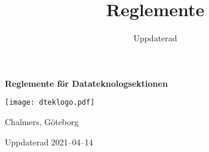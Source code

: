 \documentclass{dtek}
\title{Reglemente}
\date{Uppdaterad \updated}
\newcommand{\updated}{2021--04--14}
\begin{document}
\makeheadfoot%

\begin{center}
  {\Huge \textbf{Reglemente för Datateknologsektionen}}

  \texttt{[image: dteklogo.pdf]}

  {\LARGE Chalmers, Göteborg}

  \vspace{2cm}

  {\LARGE Uppdaterad \updated}
\end{center}

\newpage

\setcounter{tocdepth}{2}
\tableofcontents

\newpage

\end{document}
